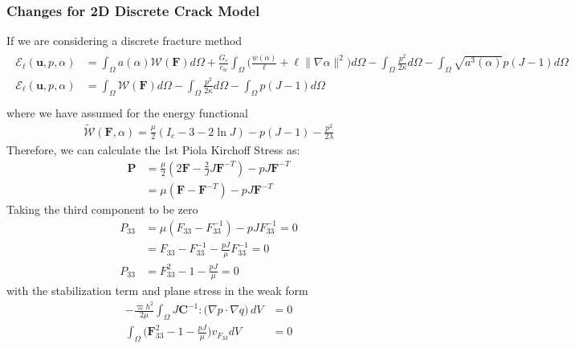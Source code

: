 \documentclass[12pt,3p]{article}
\numberwithin{equation}{section}
\begin{document}
\subsubsection{Changes for 2D Discrete Crack Model}
If we are considering a discrete fracture method
\begin{align*}
\begin{split}
\mathcal{E}_{\ell}\left(\boldsymbol{u}, p, \alpha\right) &= \int_{\Omega} a(\alpha) \mathcal{W}(\mathbf{F}) d \Omega + \frac{G_{c}}{c_{w}} \int_{\Omega} \bigg(\frac{w(\alpha)}{\ell} + \ell\|\nabla \alpha\|^{2} \bigg) d \Omega- \int_{\Omega} \frac{p^{2}}{2 \kappa} d \Omega - \int_{\Omega} \sqrt{a^{3}(\alpha)} p(J-1) d \Omega \\
\mathcal{E}_{\ell}\left(\boldsymbol{u}, p, \alpha\right) &= \int_{\Omega} \mathcal{W}(\mathbf{F}) d \Omega - \int_{\Omega} \frac{p^{2}}{2 \kappa} d \Omega - \int_{\Omega} p(J-1) d \Omega \\
\end{split}
\end{align*}
where we have assumed for the energy functional 
\begin{align*}
\widetilde{\mathcal{W}} (\mathbf{F}, \alpha) = \frac{\mu}{2} (I_c - 3 - 2 \ln J) - p (J-1) - \frac{p^2}{2 \lambda}
\end{align*}
Therefore, we can calculate the 1st Piola Kirchoff Stress as:
\begin{align*}
\mathbf{P} &= \frac{\mu}{2} (2 \mathbf{F} - \frac{2}{J} J \mathbf{F}^{-T}) - p J \mathbf{F}^{-T} \\
		&= \mu (\mathbf{F} - \mathbf{F}^{-T}) - p J \mathbf{F}^{-T}
\end{align*}
Taking the third component to be zero
\begin{align*}
P_{33} &=  \mu (F_{33} - F_{33}^{-1}) - p J F_{33}^{-1} = 0 \\
		&= F_{33} - F_{33}^{-1} - \frac{p J}{\mu} F_{33}^{-1} = 0 \\
P_{33} &= F_{33}^2 - 1 - \frac{p J}{\mu} = 0
\end{align*}
with the stabilization term and plane stress in the weak form 
\begin{align*}
- \frac{\varpi h^2}{2\mu} \int_{\Omega} J \mathbf{C}^{-1} : \big( \nabla p \cdot \nabla q \big) \,dV &= 0 \\
\int_{\Omega} \bigg( \mathbf{F}_{33}^2 - 1 - \frac{p J}{\mu} \bigg) v_{F_{33}} dV &= 0
\end{align*}
\end{document}
